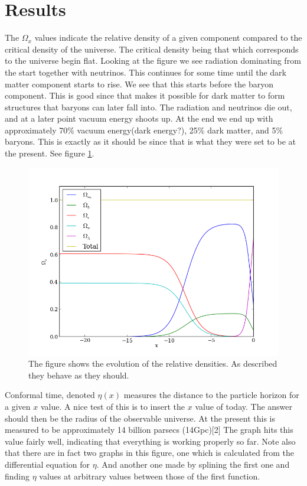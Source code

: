 \documentclass{aa}   %
\begin{document}
\section{Results}\label{sec:simulate_analytic}
 The $\Omega_x$ values indicate the relative density of a given component compared to the critical density of the universe. 
 The critical density being that which corresponds to the universe begin flat.
 Looking at the figure we see radiation dominating from the start together with neutrinos.
 This continues for some time until the dark matter component starts to rise.
 We see that this starts before the baryon component. This is good since that makes it possible for dark matter to form structures that baryons can later fall into. The radiation and neutrinos die out, and at a later point vacuum energy shoots up. At the end we end up with approximately 70\% vacuum energy(dark energy?), 25\% dark matter, and 5\% baryons. This is exactly as it should be since that is what they were set to be at the present. See figure \ref{figure0}.
 \begin{figure}[ht]
  \includegraphics[width=.49\textwidth]{figure_0.png}
  \caption{The figure shows the evolution of the relative densities. As described they behave as they should.}
 \label{figure0}
 \end{figure}
 
 Conformal time, denoted $\eta(x)$ measures the distance to the particle horizon for a given $x$ value. A nice test of this is to insert the $x$ value of today.
 The answer should then be the radius of the observable universe. At the present this is measured to be approximately 14 billion parsecs (14Gpc)[2]
 The graph hits this value fairly well, indicating that everything is working properly so far. 
 Note also that there are in fact two graphs in this figure, one which is calculated from the differential equation for $\eta$. 
 And another one made by splining the first one and finding $\eta$ values at arbitrary values between those of the first function.
 
\end{document}
